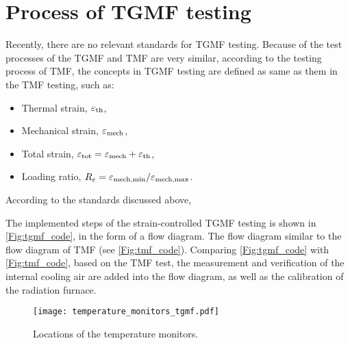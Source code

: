 

\section{Process of TGMF testing}
\noindent
Recently, there are no relevant standards for TGMF testing. Because of the test processes of the TGMF and TMF are very similar, according to the testing process of TMF, the concepts in TGMF testing are defined as same as them in the TMF testing, such as:
\begin{itemize}
  \item {Thermal strain}, $\varepsilon_{\rm{th}}$,
  \item {Mechanical strain}, $\varepsilon_{\rm{mech}}$,
  \item {Total strain}, $\varepsilon_{\rm{tot}}=\varepsilon_{\rm{mech}}+\varepsilon_{\rm{th}}$,
  \item {Loading ratio}, $R_{\varepsilon}=\varepsilon_{\rm{mech,min}}/\varepsilon_{\rm{mech,max}}$.
\end{itemize}

According to the standards discussed above, 

The implemented steps of the strain-controlled TGMF testing is shown in \ref{Fig:tgmf_code}, in the form of a flow diagram. The flow diagram similar to the flow diagram of TMF (see \ref{Fig:tmf_code}). Comparing \ref{Fig:tgmf_code} with \ref{Fig:tmf_code}, based on the TMF test, the measurement and verification of the internal cooling air are added into the flow diagram, as well as the calibration of the radiation furnace.

\begin{figure}[!htp]
	\centering
	\texttt{[image: temperature\_monitors\_tgmf.pdf]}
	\caption{Locations of the temperature monitors.}
	\label{Fig:temperature_monitors_tgmf}
\end{figure}

